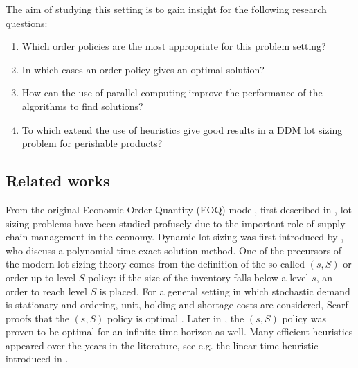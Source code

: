 The aim of studying this setting is to gain insight for the following research questions:
\begin{enumerate}
\item Which order policies are the most appropriate for this problem setting?
\item In which cases an order policy gives an optimal solution?
\item How can the use of parallel computing improve the performance of the algorithms to find solutions?
\item To which extend the use of heuristics give good results in a DDM lot sizing problem for perishable products?
\end{enumerate}

\subsection{Related works}
\label{subsec:worksperishables}
From the original Economic Order Quantity (EOQ) model, first described in \cite{Harris}, lot sizing problems have been studied profusely due to the important role of supply chain management in the economy. Dynamic lot sizing was first introduced by \cite{Wagner:dynamiclotsize}, who discuss a polynomial time exact solution method. One of the precursors of the modern lot sizing theory comes from the definition of the so-called $(s,S)$ or order up to level $S$ policy: if the size of the inventory falls below a level $s$, an order to reach level $S$ is placed. For a general setting in which stochastic demand is stationary and ordering, unit, holding and shortage costs are considered, Scarf  proofs that the $(s,S)$ policy is optimal \cite{ScarfsS}.
Later in \cite{IglehartOptimalitysS}, the $(s,S)$ policy was proven to be optimal for an infinite time horizon as well. Many efficient heuristics appeared over the years in the literature, see e.g. the linear time heuristic introduced in \cite{SilverMeal1973}.

